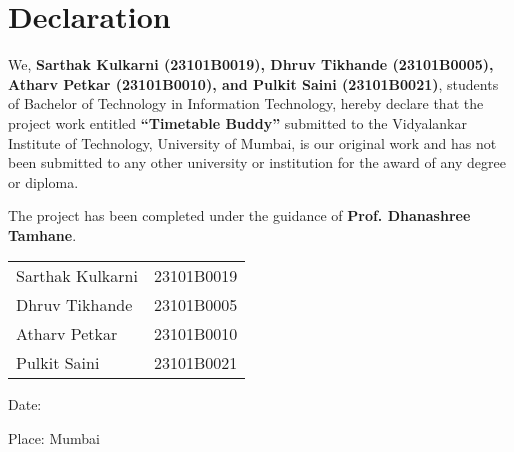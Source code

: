 \chapter*{Declaration}
\thispagestyle{empty}

We, \textbf{Sarthak Kulkarni (23101B0019), Dhruv Tikhande (23101B0005), Atharv Petkar (23101B0010), and Pulkit Saini (23101B0021)}, students of Bachelor of Technology in Information Technology, hereby declare that the project work entitled \textbf{``Timetable Buddy''} submitted to the Vidyalankar Institute of Technology, University of Mumbai, is our original work and has not been submitted to any other university or institution for the award of any degree or diploma.

The project has been completed under the guidance of \textbf{Prof. Dhanashree Tamhane}.

\vspace{2cm}

\noindent\begin{tabular}{@{}ll}
    Sarthak Kulkarni & 23101B0019 \\
    Dhruv Tikhande & 23101B0005 \\
    Atharv Petkar & 23101B0010 \\
    Pulkit Saini & 23101B0021 \\
\end{tabular}

\vspace{2cm}

\noindent Date: \underline{\hspace{3cm}}

\noindent Place: Mumbai
